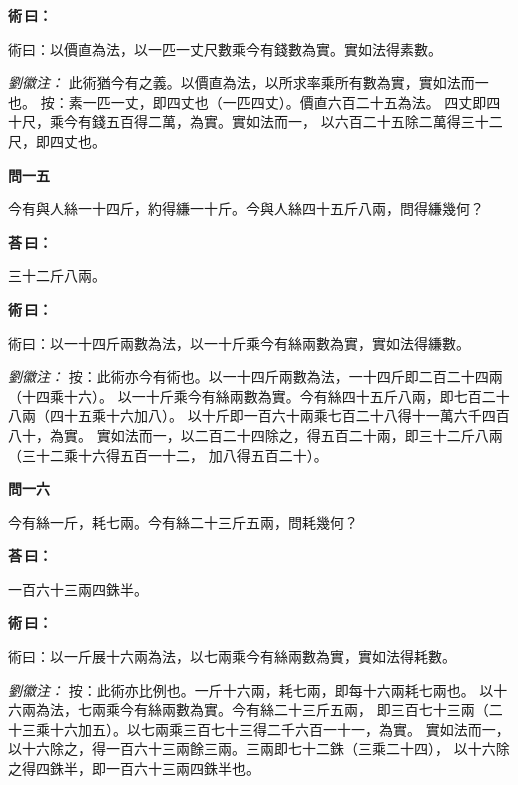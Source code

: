 \documentclass[11pt,a4paper]{article}
\newenvironment{problem}[1][]{%
  \par\vspace{0.6em}\noindent\textcolor{problemcolor}{\textbf{問\ignorespaces#1\unskip}\hspace{0.5em}}%
  \ignorespaces
}{\par\vspace{0.4em}}
\newenvironment{answer}{%
  \par\noindent\textcolor{answercolor}{\textbf{荅\,曰：}}%
  \ignorespaces
}{\par\vspace{0.3em}}
\newenvironment{method}{%
  \par\noindent\textcolor{methodcolor}{\textbf{術\,曰：}}%
  \ignorespaces
}{\par\vspace{0.4em}}
\newenvironment{liuhuicomm}{%
  \par\vspace{0.3em}\noindent\textcolor{commentarycolor}{\small\textit{劉徽注：}}}%
  {\par\vspace{0.5em}}
\begin{document}
\begin{method}
術曰：以價直為法，以一匹一丈尺數乘今有錢數為實。實如法得素數。
\end{method}

\begin{liuhuicomm}
此術猶今有之義。以價直為法，以所求率乘所有數為實，實如法而一也。
按：素一匹一丈，即四丈也（一匹四丈）。價直六百二十五為法。
四丈即四十尺，乘今有錢五百得二萬，為實。實如法而一，
以六百二十五除二萬得三十二尺，即四丈也。
\end{liuhuicomm}

\begin{problem}[一五]
今有與人絲一十四斤，約得縑一十斤。今與人絲四十五斤八兩，問得縑幾何？
\end{problem}

\begin{answer}
三十二斤八兩。
\end{answer}

\begin{method}
術曰：以一十四斤兩數為法，以一十斤乘今有絲兩數為實，實如法得縑數。
\end{method}

\begin{liuhuicomm}
按：此術亦今有術也。以一十四斤兩數為法，一十四斤即二百二十四兩（十四乘十六）。
以一十斤乘今有絲兩數為實。今有絲四十五斤八兩，即七百二十八兩（四十五乘十六加八）。
以十斤即一百六十兩乘七百二十八得十一萬六千四百八十，為實。
實如法而一，以二百二十四除之，得五百二十兩，即三十二斤八兩（三十二乘十六得五百一十二，
加八得五百二十）。
\end{liuhuicomm}

\begin{problem}[一六]
今有絲一斤，耗七兩。今有絲二十三斤五兩，問耗幾何？
\end{problem}

\begin{answer}
一百六十三兩四銖半。
\end{answer}

\begin{method}
術曰：以一斤展十六兩為法，以七兩乘今有絲兩數為實，實如法得耗數。
\end{method}

\begin{liuhuicomm}
按：此術亦比例也。一斤十六兩，耗七兩，即每十六兩耗七兩也。
以十六兩為法，七兩乘今有絲兩數為實。今有絲二十三斤五兩，
即三百七十三兩（二十三乘十六加五）。以七兩乘三百七十三得二千六百一十一，為實。
實如法而一，以十六除之，得一百六十三兩餘三兩。三兩即七十二銖（三乘二十四），
以十六除之得四銖半，即一百六十三兩四銖半也。
\end{liuhuicomm}
\end{document}
